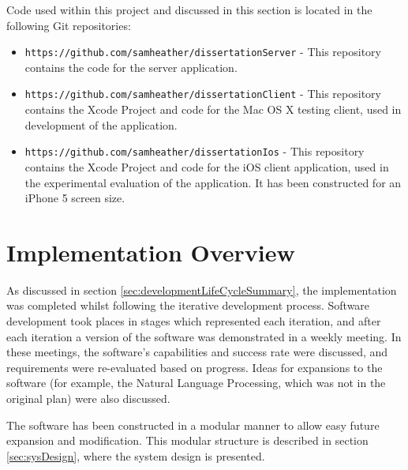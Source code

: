 \documentclass[authoryearcitations]{UoYCSproject}
\begin{document}
Code used within this project and discussed in this section is located in the following Git repositories:
\begin{itemize}
  \item \texttt{https://github.com/samheather/dissertationServer} - This repository contains the code for the server application.
  \item \texttt{https://github.com/samheather/dissertationClient} - This repository contains the Xcode Project and code for the Mac OS X testing client, used in development of the application.
  \item \texttt{https://github.com/samheather/dissertationIos} - This repository contains the Xcode Project and code for the iOS client application, used in the experimental evaluation of the application. It has been constructed for an iPhone 5 screen size.
\end{itemize}

\section{Implementation Overview}
As discussed in section \ref{sec:developmentLifeCycleSummary}, the implementation was completed whilst following the iterative development process. Software development took places in stages which represented each iteration, and after each iteration a version of the software was demonstrated in a weekly meeting. In these meetings, the software's capabilities and success rate were discussed, and requirements were re-evaluated based on progress. Ideas for expansions to the software (for example, the Natural Language Processing, which was not in the original plan) were also discussed.

The software has been constructed in a modular manner to allow easy future expansion and modification. This modular structure is described in section \ref{sec:sysDesign}, where the system design is presented.
\end{document}
